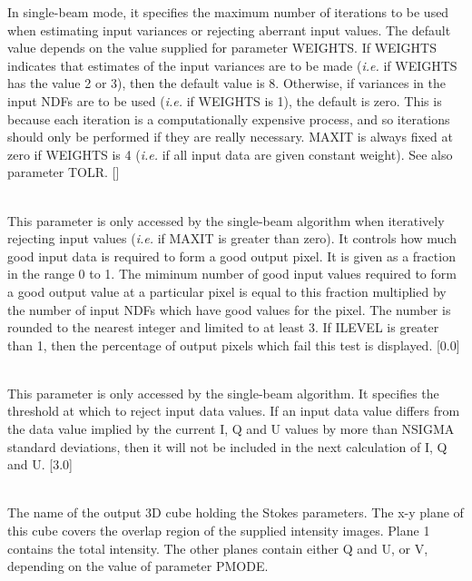 \documentclass[twoside,11pt]{article}
\renewcommand{\_}{\texttt{\symbol{95}}}
\newcommand{\sstsubsection}[1]{ \item[{#1}] \mbox{} \\}
\newcommand{\sstsubsection}[1]{\item[{#1}]}
\begin{document}
{{{         In single-beam mode, it specifies the maximum number of iterations
         to be used when estimating input variances or rejecting aberrant
         input values. The default value depends on the value supplied for
         parameter WEIGHTS. If WEIGHTS indicates that estimates of the input
         variances are to be made (\emph{i.e.} if WEIGHTS has the value 2 or 3),
         then the default value is 8. Otherwise, if variances in the input
         NDFs are to be used (\emph{i.e.} if WEIGHTS is 1), the default is zero.
         This is because each iteration is a computationally expensive
         process, and so iterations should only be performed if they are
         really necessary. MAXIT is always fixed at zero if WEIGHTS is 4
         (\emph{i.e.} if all input data are given constant weight). See also
         parameter TOLR. []
      }
      \sstsubsection{
         MINFRAC = \_REAL (Read)
      }{
         This parameter is only accessed by the single-beam algorithm
         when iteratively rejecting input values (\emph{i.e.} if MAXIT is
         greater than zero). It controls how much good input data is
         required to form a good output pixel. It is given as a fraction
         in the range 0 to 1. The miminum number of good input values
         required to form a good output value at a particular pixel is
         equal to this fraction multiplied by the number of input NDFs
         which have good values for the pixel. The number is rounded to
         the nearest integer and limited to at least 3. If ILEVEL is
         greater than 1, then the percentage of output pixels which fail
         this test is displayed. [0.0]
      }
      \sstsubsection{
         NSIGMA = \_REAL (Read)
      }{
         This parameter is only accessed by the single-beam algorithm. It
         specifies the threshold at which to reject input data values. If
         an input data value differs from the data value implied by the
         current I, Q and U values by more than NSIGMA standard
         deviations, then it will not be included in the next calculation
         of I, Q and U. [3.0]
      }
      \sstsubsection{
         OUT = NDF (Read)
      }{
         The name of the output 3D cube holding the Stokes parameters.
         The x-y plane of this cube covers the overlap region of the
         supplied intensity images. Plane 1 contains the total intensity.
         The other planes contain either Q and U, or V, depending on the
         value of parameter PMODE.
      }
      \sstsubsection{
         PMODE = LITERAL (Read)
      }{
}}}
\end{document}

